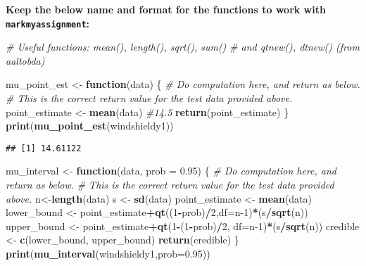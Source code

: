 \documentclass[
]{article}
\newenvironment{Shaded}{\begin{snugshade}}{\end{snugshade}}
\newcommand{\AttributeTok}[1]{\textcolor[rgb]{0.13,0.29,0.53}{#1}}
\newcommand{\CommentTok}[1]{\textcolor[rgb]{0.56,0.35,0.01}{\textit{#1}}}
\newcommand{\ControlFlowTok}[1]{\textcolor[rgb]{0.13,0.29,0.53}{\textbf{#1}}}
\newcommand{\DecValTok}[1]{\textcolor[rgb]{0.00,0.00,0.81}{#1}}
\newcommand{\FloatTok}[1]{\textcolor[rgb]{0.00,0.00,0.81}{#1}}
\newcommand{\FunctionTok}[1]{\textcolor[rgb]{0.13,0.29,0.53}{\textbf{#1}}}
\newcommand{\NormalTok}[1]{#1}
\newcommand{\OtherTok}[1]{\textcolor[rgb]{0.56,0.35,0.01}{#1}}
\newcommand{\SpecialCharTok}[1]{\textcolor[rgb]{0.81,0.36,0.00}{\textbf{#1}}}
\begin{document}
\textbf{Keep the below name and format for the functions to work with
\texttt{markmyassignment}:}

\begin{Shaded}
\begin{Highlighting}[]
\CommentTok{\# Useful functions: mean(), length(), sqrt(), sum()}
\CommentTok{\# and qtnew(), dtnew() (from aaltobda)}

\NormalTok{mu\_point\_est }\OtherTok{\textless{}{-}} \ControlFlowTok{function}\NormalTok{(data) \{}
    \CommentTok{\# Do computation here, and return as below.}
    \CommentTok{\# This is the correct return value for the test data provided above.}
\NormalTok{  point\_estimate }\OtherTok{\textless{}{-}} \FunctionTok{mean}\NormalTok{(data)}
    \CommentTok{\#14.5}
    \FunctionTok{return}\NormalTok{(point\_estimate)}
\NormalTok{\}}
\FunctionTok{print}\NormalTok{(}\FunctionTok{mu\_point\_est}\NormalTok{(windshieldy1))}
\end{Highlighting}
\end{Shaded}

\begin{verbatim}
## [1] 14.61122
\end{verbatim}

\begin{Shaded}
\begin{Highlighting}[]
\NormalTok{mu\_interval }\OtherTok{\textless{}{-}} \ControlFlowTok{function}\NormalTok{(data, }\AttributeTok{prob =} \FloatTok{0.95}\NormalTok{) \{}
    \CommentTok{\# Do computation here, and return as below.}
    \CommentTok{\# This is the correct return value for the test data provided above.}
\NormalTok{    n}\OtherTok{\textless{}{-}}\FunctionTok{length}\NormalTok{(data)}
\NormalTok{    s }\OtherTok{\textless{}{-}} \FunctionTok{sd}\NormalTok{(data)}
\NormalTok{    point\_estimate }\OtherTok{\textless{}{-}} \FunctionTok{mean}\NormalTok{(data)}
\NormalTok{    lower\_bound }\OtherTok{\textless{}{-}}\NormalTok{ point\_estimate}\SpecialCharTok{+}\FunctionTok{qt}\NormalTok{((}\DecValTok{1}\SpecialCharTok{{-}}\NormalTok{prob)}\SpecialCharTok{/}\DecValTok{2}\NormalTok{,}\AttributeTok{df=}\NormalTok{n}\DecValTok{{-}1}\NormalTok{)}\SpecialCharTok{*}\NormalTok{(s}\SpecialCharTok{/}\FunctionTok{sqrt}\NormalTok{(n))}
\NormalTok{    upper\_bound }\OtherTok{\textless{}{-}}\NormalTok{ point\_estimate}\SpecialCharTok{+}\FunctionTok{qt}\NormalTok{(}\DecValTok{1}\SpecialCharTok{{-}}\NormalTok{(}\DecValTok{1}\SpecialCharTok{{-}}\NormalTok{prob)}\SpecialCharTok{/}\DecValTok{2}\NormalTok{, }\AttributeTok{df=}\NormalTok{n}\DecValTok{{-}1}\NormalTok{)}\SpecialCharTok{*}\NormalTok{(s}\SpecialCharTok{/}\FunctionTok{sqrt}\NormalTok{(n))}
\NormalTok{    credible }\OtherTok{\textless{}{-}} \FunctionTok{c}\NormalTok{(lower\_bound, upper\_bound)}
    \FunctionTok{return}\NormalTok{(credible)}
\NormalTok{\}}
\FunctionTok{print}\NormalTok{(}\FunctionTok{mu\_interval}\NormalTok{(windshieldy1,}\AttributeTok{prob=}\FloatTok{0.95}\NormalTok{))}
\end{Highlighting}
\end{Shaded}
\end{document}
